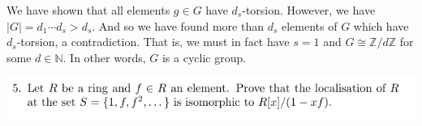 \documentclass[12pt,letterpaper,boxed]{hmcpset}
\newcommand{\Z}{\mathbb Z}
\newcommand{\abs}[1]{\left|#1\right|}
\begin{document}
\begin{solution}
\begin{enumerate}[(a)]
We have shown that all elements $g \in G$ have $d_s$-torsion.
However, we have $\abs G = d_1 \cdots d_s > d_s$. And
so we have found more than $d_s$ elements of $G$ which have
$d_s$-torsion, a contradiction. That is, we must in fact have $s=1$
and $G \cong
\Z/d\Z$ for some $d \in \mathbb N$. In other words, $G$ is a cyclic
group.


\end{enumerate}
\end{solution}

\newpage

\begin{problem}
	\includegraphics[scale=0.8]{5.png}
	\hfill
\end{problem}
\end{document}
